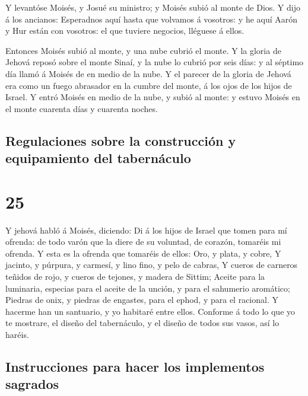  Y levantóse Moisés, y Josué su ministro; y Moisés subió al
monte de Dios.  Y dijo á los ancianos: Esperadnos aquí
hasta que volvamos á vosotros: y he aquí Aarón y Hur están con vosotros:
el que tuviere negocios, lléguese á ellos.

 Entonces Moisés subió al monte, y una nube cubrió el
monte.  Y la gloria de Jehová reposó sobre el monte Sinaí,
y la nube lo cubrió por seis días: y al séptimo día llamó á Moisés de en
medio de la nube.  Y el parecer de la gloria de Jehová era
como un fuego abrasador en la cumbre del monte, á los ojos de los hijos
de Israel.  Y entró Moisés en medio de la nube, y subió al
monte: y estuvo Moisés en el monte cuarenta días y cuarenta noches.

\hypertarget{regulaciones-sobre-la-construcciuxf3n-y-equipamiento-del-tabernuxe1culo}{%
\subsection{Regulaciones sobre la construcción y equipamiento del
tabernáculo}\label{regulaciones-sobre-la-construcciuxf3n-y-equipamiento-del-tabernuxe1culo}}

\hypertarget{section-24}{%
\section{25}\label{section-24}}

 Y jehová habló á Moisés, diciendo:  Di á los
hijos de Israel que tomen para mí ofrenda: de todo varón que la diere de
su voluntad, de corazón, tomaréis mi ofrenda.  Y esta es la
ofrenda que tomaréis de ellos: Oro, y plata, y cobre,  Y
jacinto, y púrpura, y carmesí, y lino fino, y pelo de cabras,
 Y cueros de carneros teñidos de rojo, y cueros de tejones,
y madera de Sittim;  Aceite para la luminaria, especias para
el aceite de la unción, y para el sahumerio aromático; 
Piedras de onix, y piedras de engastes, para el ephod, y para el
racional.  Y hacerme han un santuario, y yo habitaré entre
ellos.  Conforme á todo lo que yo te mostrare, el diseño del
tabernáculo, y el diseño de todos sus vasos, así lo haréis.

\hypertarget{instrucciones-para-hacer-los-implementos-sagrados}{%
\subsection{Instrucciones para hacer los implementos
sagrados}\label{instrucciones-para-hacer-los-implementos-sagrados}}

